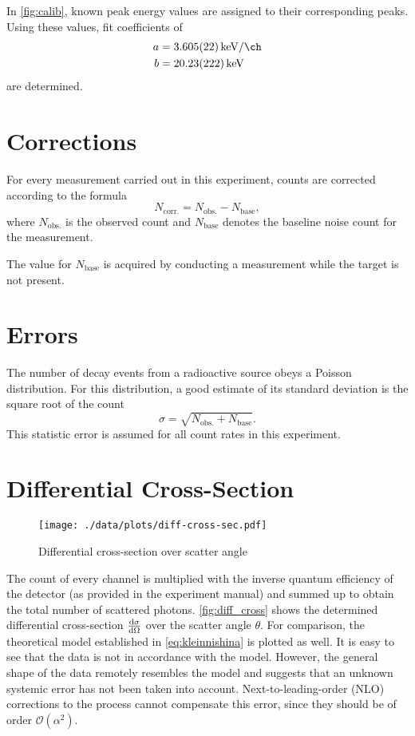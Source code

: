 In \autoref{fig:calib}, known peak energy values are assigned to their corresponding peaks.
Using these values, fit coefficients of
\begin{align*}
	a &= \SI{3.605(22)}{\kilo\eV\per\ch} \\
	b &= \SI{20.23(222)}{\kilo\eV}
\end{align*}
are determined.

\section{Corrections}
For every measurement carried out in this experiment, counts are corrected according to the formula
\begin{equation*}
	N_\text{corr.} = N_\text{obs.} - N_\text{base},
\end{equation*}
where $N_\text{obs.}$ is the observed count and $N_\text{base}$ denotes the baseline noise count for the measurement.

The value for $N_\text{base}$ is acquired by conducting a measurement while the target is not present.

\section{Errors}
The number of decay events from a radioactive source obeys a Poisson distribution.
For this distribution, a good estimate of its standard deviation is the square root of the count
\begin{equation*}
	\sigma = \sqrt{N_\text{obs.} + N_\text{base}}.
\end{equation*}
This statistic error is assumed for all count rates in this experiment.

\section{Differential Cross-Section}\label{sec:diff_cross_res}
\begin{figure}
	\centering
	\texttt{[image: ./data/plots/diff-cross-sec.pdf]}
	\caption{Differential cross-section over scatter angle}
	\label{fig:diff_cross}
\end{figure}

The count of every channel is multiplied with the inverse quantum efficiency of the detector (as provided in the experiment manual) and summed up to obtain the total number of scattered photons.
\autoref{fig:diff_cross} shows the determined differential cross-section $\frac{\text{d}\sigma}{\text{d}\Omega}$ over the scatter angle $\theta$.
For comparison, the theoretical model established in \autoref{eq:kleinnishina} is plotted as well.
It is easy to see that the data is not in accordance with the model.
However, the general shape of the data remotely resembles the model and suggests that an unknown systemic error has not been taken into account.
Next-to-leading-order (NLO) corrections to the process cannot compensate this error, since they should be of order $\mathcal{O}(\alpha^2)$.

